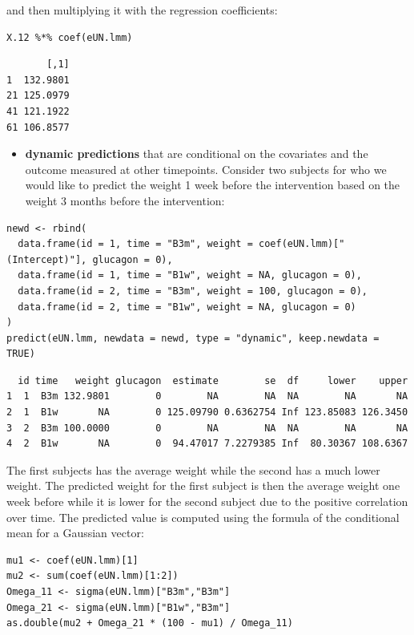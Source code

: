 \documentclass[12pt]{article}
\begin{document}
and then multiplying it with the regression coefficients:
\lstset{language=r,label= ,caption= ,captionpos=b,numbers=none}
\begin{lstlisting}
X.12 %*% coef(eUN.lmm)
\end{lstlisting}

\begin{verbatim}
       [,1]
1  132.9801
21 125.0979
41 121.1922
61 106.8577
\end{verbatim}


\clearpage

\begin{itemize}
\item \textbf{dynamic predictions} that are conditional on the covariates and the
outcome measured at other timepoints. Consider two subjects for who
we would like to predict the weight 1 week before the intervention
based on the weight 3 months before the intervention:
\end{itemize}

\begin{lstlisting}
newd <- rbind(
  data.frame(id = 1, time = "B3m", weight = coef(eUN.lmm)["(Intercept)"], glucagon = 0),
  data.frame(id = 1, time = "B1w", weight = NA, glucagon = 0),
  data.frame(id = 2, time = "B3m", weight = 100, glucagon = 0),
  data.frame(id = 2, time = "B1w", weight = NA, glucagon = 0)
)
predict(eUN.lmm, newdata = newd, type = "dynamic", keep.newdata = TRUE)
\end{lstlisting}

\begin{verbatim}
  id time   weight glucagon  estimate        se  df     lower    upper
1  1  B3m 132.9801        0        NA        NA  NA        NA       NA
2  1  B1w       NA        0 125.09790 0.6362754 Inf 123.85083 126.3450
3  2  B3m 100.0000        0        NA        NA  NA        NA       NA
4  2  B1w       NA        0  94.47017 7.2279385 Inf  80.30367 108.6367
\end{verbatim}


The first subjects has the average weight while the second has a much
  lower weight. The predicted weight for the first subject is then the
  average weight one week before while it is lower for the second
  subject due to the positive correlation over time. The predicted
  value is computed using the formula of the conditional mean for a
  Gaussian vector:
\lstset{language=r,label= ,caption= ,captionpos=b,numbers=none}
\begin{lstlisting}
mu1 <- coef(eUN.lmm)[1]
mu2 <- sum(coef(eUN.lmm)[1:2])
Omega_11 <- sigma(eUN.lmm)["B3m","B3m"]
Omega_21 <- sigma(eUN.lmm)["B1w","B3m"]
as.double(mu2 + Omega_21 * (100 - mu1) / Omega_11)
\end{lstlisting}
\end{document}
